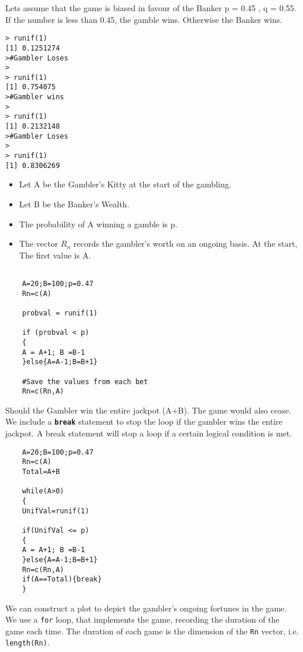 \documentclass[a4paper,12pt]{article}
\begin{document}
Lets assume that the game is biased in favour of the Banker
p = 0.45 , q = 0.55.
If the number is less than 0.45, the gamble wins. Otherwise the Banker wins.

\begin{verbatim}
> runif(1)
[1] 0.1251274
>#Gambler Loses
>
> runif(1)
[1] 0.754075
>#Gambler wins
>
> runif(1)
[1] 0.2132148
>#Gambler Loses
>
> runif(1)
[1] 0.8306269
\end{verbatim}

\newpage
\begin{itemize}
	\item Let A be the Gambler's Kitty at the start of the gambling.
	\item Let B be the Banker's Wealth.
	\item The probability of A winning a gamble is p.
	\item The vector $R_n$ records the gambler's worth on an ongoing basis. At the start, The first value is A.
\end{itemize}

\begin{framed}
	\begin{verbatim}
	
	A=20;B=100;p=0.47
	Rn=c(A)
	
	probval = runif(1)
	
	if (probval < p)
	{
	A = A+1; B =B-1
	}else{A=A-1;B=B+1}
	
	#Save the values from each bet
	Rn=c(Rn,A)
	\end{verbatim}
\end{framed}
\newpage
Should the Gambler win the entire jackpot (A+B). The game would also cease. We include a \textbf{\texttt{break}} statement to stop the loop if the gambler wins the entire jackpot. A break statement will stop a loop if a certain logical condition is met.

\begin{framed}
	\begin{verbatim}
	A=20;B=100;p=0.47
	Rn=c(A)
	Total=A+B
	
	while(A>0)
	{
	UnifVal=runif(1)
	
	if(UnifVal <= p)
	{
	A = A+1; B =B-1
	}else{A=A-1;B=B+1}
	Rn=c(Rn,A)
	if(A==Total){break}
	}
	\end{verbatim}
\end{framed}
We can construct a plot to depict the gambler's ongoing fortunes in the game. We use a \texttt{for} loop, that implements the game, recording the duration of the game each time. The duration of each game is the dimension of the \texttt{Rn} vector, i.e. \texttt{length(Rn)}.
\end{document}
